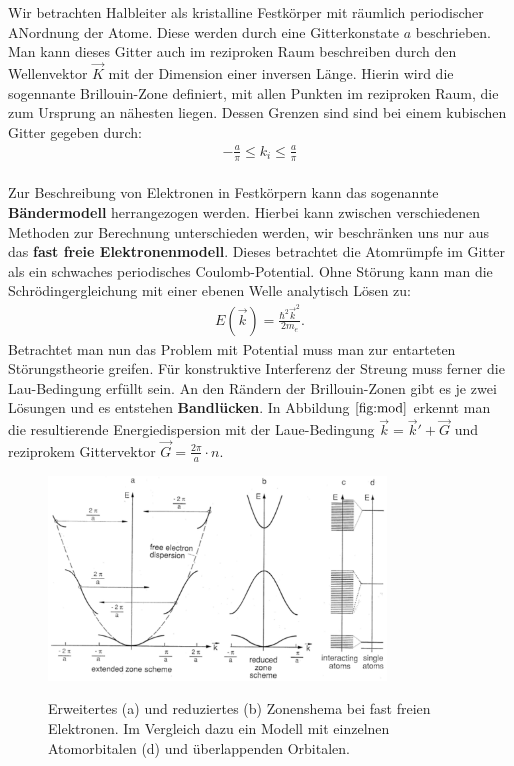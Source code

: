 Wir betrachten Halbleiter als kristalline Festkörper mit räumlich periodischer ANordnung der Atome. Diese werden durch eine Gitterkonstate $a$ beschrieben. Man kann dieses Gitter auch im reziproken Raum beschreiben durch den Wellenvektor $\Vec{K}$ mit der Dimension einer inversen Länge. Hierin wird die sogennante Brillouin-Zone definiert, mit allen Punkten im reziproken Raum, die zum Ursprung an nähesten liegen. Dessen Grenzen sind sind bei einem kubischen Gitter gegeben durch:
\begin{align}
    -\frac{a}{\pi} \leq k_i \leq \frac{a}{\pi}
\end{align}
\\
Zur Beschreibung von Elektronen in Festkörpern kann das sogenannte \textbf{Bändermodell} herrangezogen werden. Hierbei kann zwischen verschiedenen Methoden zur Berechnung unterschieden werden, wir beschränken uns nur aus das \textbf{fast freie Elektronenmodell}. Dieses betrachtet die Atomrümpfe im Gitter als ein schwaches periodisches Coulomb-Potential. Ohne Störung kann man die Schrödingergleichung mit einer ebenen Welle analytisch Lösen zu:
\begin{align}
    E(\Vec{k}) = \frac{\hbar^2\Vec{k}^2}{2m_e}.
\end{align}
Betrachtet man nun das Problem mit Potential muss man zur entarteten Störungstheorie greifen. Für konstruktive Interferenz der Streung muss ferner die Lau-Bedingung erfüllt sein. An den Rändern der Brillouin-Zonen gibt es je zwei Lösungen und es entstehen \textbf{Bandlücken}. In Abbildung $\autoref{fig:mod}$ erkennt man die resultierende Energiedispersion mit der Laue-Bedingung $ \Vec{k} = \Vec{k}' + \Vec{G}$ und reziprokem Gittervektor $\Vec{G} = \frac{2 \pi}{a} \cdot n$. 
\begin{figure}
    \centering
    \caption{Erweitertes (a) und reduziertes (b) Zonenshema bei fast freien Elektronen. Im Vergleich dazu ein Modell mit einzelnen Atomorbitalen (d) und überlappenden Orbitalen.}
    \includegraphics[width=0.8\textwidth]{./fig/band_mod.png}
    \label{fig:mod}
\end{figure}
